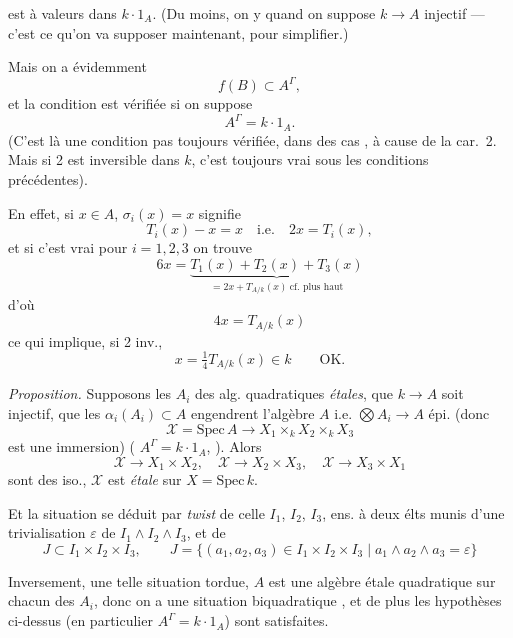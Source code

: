 \documentclass[11pt,a4paper]{article}
\begin{document}

est à valeurs dans $k \cdot 1_A$. (Du moins, on y  quand on suppose $k \to A$ injectif — c'est ce qu'on va supposer maintenant, pour simplifier.)

Mais on a évidemment
\[
  f(B) \subset A^{\Gamma} ,
\]
et la condition est vérifiée si on suppose
\[
  A^{\Gamma} = k \cdot 1_A .
\]
(C'est là une condition pas toujours vérifiée,  dans des cas , à cause de la car.~2. Mais si 2 est inversible dans $k$, c'est toujours vrai sous les conditions précédentes).

En effet, si $x \in A$, $\sigma_i(x) = x$ signifie \struck{\ill{}}
\[
  T_i(x) - x = x \quad \text{i.e.} \quad 2x = T_i(x) ,
\]
et si c'est vrai pour $i = 1, 2, 3$ on trouve
\[
  6x = \underbrace{T_1(x) + T_2(x) + T_3(x)}_{= 2x + T_{A/k}(x) \ \text{cf. plus haut}}
\]
d'où
\[
  4x = T_{A/k}(x)
\]
ce qui implique, si 2 inv.,
\[
  x = \tfrac{1}{4} T_{A/k}(x) \in k \qquad \text{OK.}
\]


\emph{Proposition.} Supposons les $A_i$ des alg. quadratiques \emph{étales}, que $k \to A$ soit injectif, que les $\alpha_i(A_i) \subset A$ engendrent l'algèbre $A$ i.e. $\bigotimes A_i \to A$ épi. (donc
\[
  \mathcal{X} = \mathrm{Spec}\, A \to X_1 \times_k X_2 \times_k X_3
\]
est une immersion) ( $A^{\Gamma} = k \cdot 1_A$, \ill{} \ill{}). Alors  \add{\ill{}}
\[
  \mathcal{X} \to X_1 \times X_2 , \quad \mathcal{X} \to X_2 \times X_3 , \quad \mathcal{X} \to X_3 \times X_1
\]
sont des iso., $\mathcal{X}$ est  \emph{étale} sur $X = \mathrm{Spec}\, k$.

Et la situation se déduit par \emph{twist} de celle \struck{\ill{}} $I_1$, $I_2$, $I_3$, ens. à deux élts munis d'une trivialisation $\varepsilon$ de $I_1 \wedge I_2 \wedge I_3$, et de
\[
  J \subset I_1 \times I_2 \times I_3 , \qquad
  J = \{ (a_1, a_2, a_3) \in I_1 \times I_2 \times I_3 \mid a_1 \wedge a_2 \wedge a_3 = \varepsilon \}
\]

Inversement,  une telle situation tordue, $A$ est une algèbre étale quadratique sur chacun des $A_i$, donc on a une situation biquadratique , et de plus les hypothèses ci-dessus (en particulier $A^{\Gamma} = k \cdot 1_A$) sont satisfaites.
\end{document}
